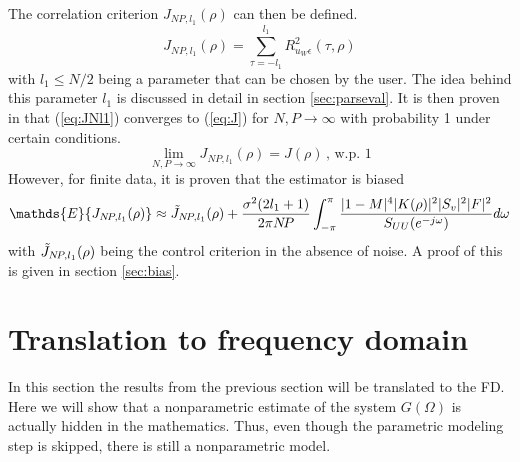 The correlation criterion $J_{N\!P,l_1}(\rho)$ can then be defined.
\begin{equation}
\boxed{
    J_{N\!P,l_1}(\rho) = \sum_{\tau=-l_1}^{l_1} R_{u_W \epsilon}^2(\tau,\rho)
}
\label{eq:JNl1}
\end{equation}
with $l_1 \leq N/2$ being a parameter that can be chosen by the user. The idea behind this parameter $l_1$ is discussed in detail in section \ref{sec:parseval}. It is then proven in \cite[Appendix II]{Data-driven_model_reference_control} that (\ref{eq:JNl1}) converges to (\ref{eq:J}) for $N,P \rightarrow \infty$ with probability 1 under certain conditions.
\begin{equation*}
    \lim_{N,P\rightarrow \infty} J_{N\!P,l_1}(\rho) = J(\rho) \,,\, \text{w.p. } 1
\end{equation*}
However, for finite data, it is proven that the estimator is biased \cite[eq. (37)]{Data-driven_model_reference_control}
\begin{equation}
    \mathds{E}\{J_{N\!P,l_1}(\rho)\} \approx \Tilde{J}_{N\!P,l_1}(\rho) + \frac{\sigma^2 (2l_1+1)}{2\pi N\!P} \int_{-\pi}^\pi \frac{|1-M|^4|K(\rho)|^2|S_v|^2|F|^2}{S_{UU}(e^{-j\omega})} d\omega
    \label{eq:bias_on_JNl1}
\end{equation}
with $\Tilde{J}_{N\!P,l_1}(\rho)$ being the control criterion in the absence of noise. A proof of this is given in section \ref{sec:bias}.

\section{Translation to frequency domain}
\label{sec:freq_domain_translate}
In this section the results from the previous section will be translated to the FD. Here we will show that a nonparametric estimate of the system $G(\Omega)$ is actually hidden in the mathematics. Thus, even though the parametric modeling step is skipped, there is still a nonparametric model.

